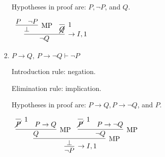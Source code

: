 \documentclass[11pt]{report}
\begin{document}
\begin{enumerate}
\begin{enumerate}
		Hypotheses in proof are: $P, \lnot P$, and $Q$.

		\begin{mdframed}
			\begin{center}
				$\begin{array}{c}
					\infer[\to I,1]{\lnot Q}
						{\infer[\MP]{\bot}{P & \lnot P}
						&
						\infer[1]{\cancel{Q}}{}}
				\end{array}$
			\end{center}
		\end{mdframed}
		
		\item $P\to Q, \ P \to \lnot Q \vdash \lnot P$
				
		\hspace{0.2cm}{\bf Solution}

		Introduction rule: negation.
			
		\vspace{0.2cm}
			
		Elimination rule: implication.
		
		\vspace{0.2cm}

		Hypotheses in proof are: $P \to Q, P \to \lnot Q$, and $P$. 

		\begin{mdframed}
			\begin{center}
				$\begin{array}{c}
					\infer[\to I,1]{\lnot P}
						{\infer[\MP]{\bot}
							{\infer[\MP]{Q}
								{\infer[1]{\cancel{P}}{}
								&
								P \to Q}
							&
							\infer[\MP]{\lnot Q}
								{\infer[1]{\cancel{P}}{}
								&
								P \to \lnot Q}}}
				\end{array}$
			\end{center}
		\end{mdframed}
		
	\end{enumerate}		

\end{enumerate}
	
\end{document}
